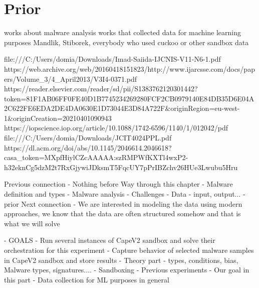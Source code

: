 \section{Prior}
works about malware analysis
works that collected data for machine learning purposes
Mandlik, Stiborek, everybody who used cuckoo or other sandbox data

file:///C:/Users/domia/Downloads/Imad-Saiida-IJCNIS-V11-N6-1.pdf
https://web.archive.org/web/20160418151823/http://www.ijarcsse.com/docs/papers/Volume_3/4_April2013/V3I4-0371.pdf
https://reader.elsevier.com/reader/sd/pii/S1383762120301442?token=81F1AB06FF0FE40D1B7745234269280FCF2CB0979140E84DB35D6E04A2C622FE6EDA2DE4DA0630E1D73044E3D84A722F&originRegion=eu-west-1&originCreation=20210401090943
https://iopscience.iop.org/article/10.1088/1742-6596/1140/1/012042/pdf
file:///C:/Users/domia/Downloads/JCIT4024PPL.pdf
https://dl.acm.org/doi/abs/10.1145/2046614.2046618?casa_token=MXpfHiylCZcAAAAA:szRMPWfKXTl4wxP2-h32eknCg5dzM2t7RxGjywiJDksmT5FqcUY7pPrIBZchv26HUe3Lwubu5Hru




Previous connection
- Nothing before
Way through this chapter
- Malware definition and types
- Malware analysis
- Challenges
- Data - input, output...
- prior
Next connection
- We are interested in modeling the data using modern approaches, we know that the data are often structured somehow and that is what we will solve

- GOALS
  - Run several instances of CapeV2 sandbox and solve their orchestration for this experiment
  - Capture behavior of selected malware samples in CapeV2 sandbox and store results
- Theory part - types, conditions, bias, Malware types, signatures....
- Sandboxing
- Previous experiments
- Our goal in this part
- Data collection for ML purposes in general